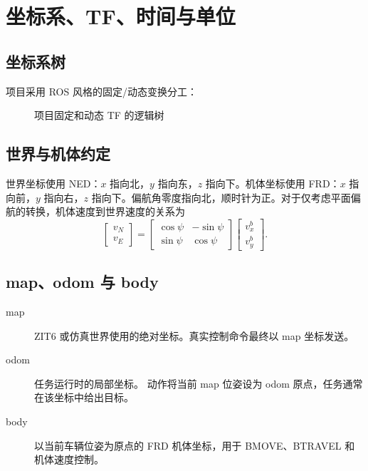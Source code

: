 \chapter{坐标系、TF、时间与单位}
\label{ch:frames}

\section{坐标系树}
项目采用 ROS 风格的固定/动态变换分工：

\begin{figure}[H]
  \centering
  \caption{项目固定和动态 TF 的逻辑树}
  \label{fig:tf-tree}
\end{figure}

\section{世界与机体约定}
世界坐标使用 NED：$x$ 指向北，$y$ 指向东，$z$ 指向下。机体坐标使用 FRD：$x$ 指向前，$y$ 指向右，$z$ 指向下。偏航角零度指向北，顺时针为正。对于仅考虑平面偏航的转换，机体速度到世界速度的关系为
\begin{equation}
  \begin{bmatrix}v_N\\v_E\end{bmatrix}
  =
  \begin{bmatrix}\cos\psi&-\sin\psi\\
  \sin\psi&\cos\psi\end{bmatrix}
  \begin{bmatrix}v_x^b\\v_y^b\end{bmatrix}.
\end{equation}

\section{map、odom 与 body}
\begin{description}
  \item[map] ZIT6 或仿真世界使用的绝对坐标。真实控制命令最终以 map 坐标发送。
  \item[odom] 任务运行时的局部坐标。 动作将当前 map 位姿设为 odom 原点，任务通常在该坐标中给出目标。
  \item[body] 以当前车辆位姿为原点的 FRD 机体坐标，用于 BMOVE、BTRAVEL 和机体速度控制。
\end{description}

